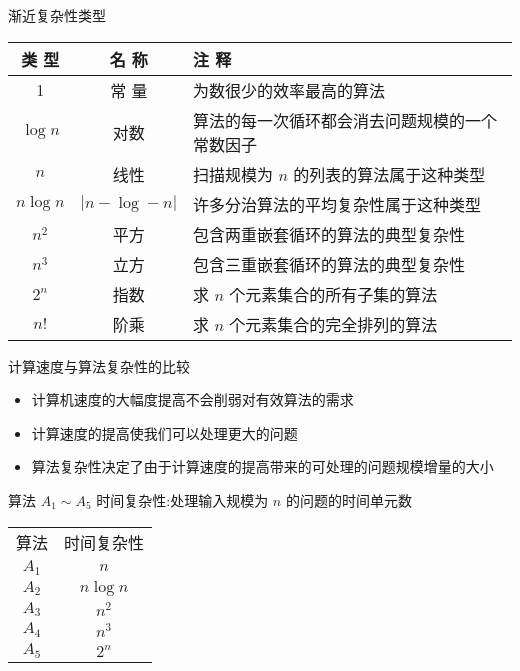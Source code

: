 \documentclass[fontset=fandol,UTF8,12pt,aspectratio=169,fleqn]{beamer}
\begin{document}
\begin{frame}{渐近复杂性类型}
\begin{table}\small %
\renewcommand\arraystretch{1.5}
\begin{tabular}{c|c|l}
  \hline
类  型 & 名  称 & \hspace{3cm} 注  释\\
\hline
1 & 常 量 & 为数很少的效率最高的算法\\
\hline
$\log n$ & 对数 &  算法的每一次循环都会消去问题规模的一个常数因子\\
\hline
$n$ & 线性 & 扫描规模为 $n$ 的列表的算法属于这种类型\\
\hline 
$n\log n$ & $|n-\log-n|$ & 许多分治算法的平均复杂性属于这种类型\\
\hline
$n^2$ & 平方 & 包含两重嵌套循环的算法的典型复杂性\\
\hline
$n^3$ & 立方 & 包含三重嵌套循环的算法的典型复杂性\\
\hline
$2^n$ & 指数 & 求 $n$ 个元素集合的所有子集的算法\\
\hline
$n!$ & 阶乘 & 求 $n$ 个元素集合的完全排列的算法\\
  \hline
\end{tabular}
\end{table}
\end{frame}

\begin{frame}{计算速度与算法复杂性的比较}
  \begin{itemize}[<+-|alert@+>]
  \item 计算机速度的大幅度提高不会削弱对有效算法的需求 
  \item 计算速度的提高使我们可以处理更大的问题  
  \item  算法复杂性决定了由于计算速度的提高带来的可处理的问题规模增量的大小  
  \end{itemize}
\end{frame}

\begin{frame}{算法 $A_1 \sim A_5$}
时间复杂性:处理输入规模为 $n$ 的问题的时间单元数 
\begin{table}
  \centering
  \begin{tabular}{cc}
    算法 &\qquad \qquad  时间复杂性\\
    $A_1$ & \qquad \qquad $n$ \\
    $A_2$ & \qquad \qquad $n \log n$ \\
    $A_3$ & \qquad \qquad $n^2$ \\
    $A_4$ & \qquad \qquad $n^3$ \\
    $A_5$ & \qquad \qquad $2^n$ \\
  \end{tabular}
\end{table}
\end{frame}
\end{document}
